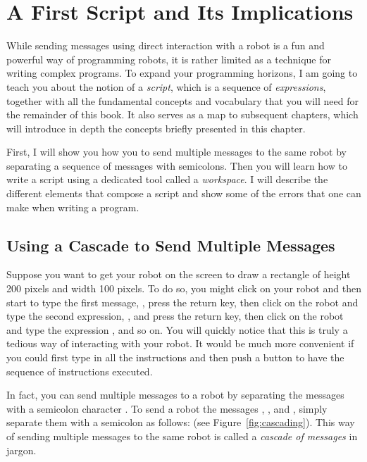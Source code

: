 \documentclass[a4paper,10pt,twoside]{book}
\begin{document}
    \sloppy
\fi

\chapter{A First Script and Its Implications}\label{cha:script}

While sending messages using direct interaction with a robot is a fun and powerful way 
of programming robots, it is rather limited as a technique for writing complex programs. To 
expand your programming horizons, I am going to teach you about the notion of a \emph{script}, 
which is a sequence of \emph{expressions}, together with all the fundamental concepts and vocabulary 
that you will need for the remainder of this book. It also serves as a map to subsequent 
chapters, which will introduce in depth the concepts briefly presented in this chapter. 

First, I will show you how you to send multiple messages to the same robot by separating 
a sequence of messages with semicolons. Then you will learn how to write a script using a 
dedicated tool called a \emph{workspace}. I will describe the different elements that compose a script and show some of the errors that one can make when writing a program. 

\newpage 
\section{Using a Cascade to Send Multiple Messages }
Suppose you want to get your robot on the screen to draw a rectangle of height 200 pixels and 
width 100 pixels. To do so, you might click on your robot and then start to type the first message, , press the return key, then click on the robot and type the second expression, , and press the return key, then click on the robot and type the expression , and so on. You will quickly notice that this is truly a tedious way of interacting with your robot. It would be much more convenient if you could first type in all the instructions and then push a button to have the sequence of instructions executed. 

In fact, you can send multiple messages to a robot by separating the messages with a 
semicolon character \ct{;}. To send a robot the messages , , and , simply separate them with a semicolon as follows:  (see Figure~\ref{fig:cascading}). This way of sending multiple messages to the same robot is called a \emph{cascade of messages} in \Squeak jargon. 
\end{document}
